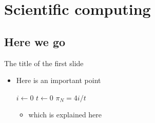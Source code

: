 %
%
%
%


\section{Scientific computing}

\subsection{Here we go}
\begin{frame}{The title of the first slide}

  \begin{itemize}
    \item Here is an important point
      \begin{algorithm}[H]
        \dontprintsemicolon
        $i \leftarrow 0$ \;
        $t \leftarrow 0$ \;
        $\pi_{N} = 4 i/t \;$ %
      \end{algorithm}
%
      \begin{itemize}
        \item which is explained here
      \end{itemize}
  \end{itemize}
\end{frame}

